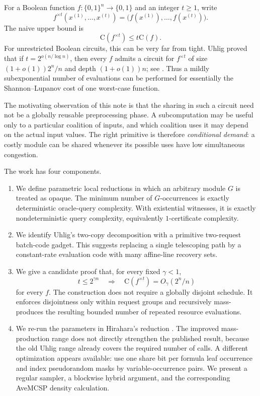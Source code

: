 \documentclass[11pt]{article}
\theoremstyle{definition}
\newcommand{\bits}{\{0,1\}}
\newcommand{\C}{\mathrm{C}}
\begin{document}
For a Boolean function $f:\bits^n\to\bits$ and an integer $t\ge 1$, write
\[
 f^{\times t}(x^{(1)},\ldots,x^{(t)})
   =\bigl(f(x^{(1)}),\ldots,f(x^{(t)})\bigr).
\]
The naive upper bound is
\[
 \C(f^{\times t})\le t\C(f).
\]
For unrestricted Boolean circuits, this can be very far from tight.  Uhlig proved that if
$t=2^{o(n/\log n)}$, then every $f$ admits a circuit for $f^{\times t}$ of size
$(1+o(1))2^n/n$ and depth $(1+o(1))n$; see \cite{Uhlig1974,Uhlig1992,Wegener1987,Kretschmer2023}.  Thus a mildly subexponential number of evaluations can be performed for essentially the Shannon--Lupanov cost of one worst-case function.

The motivating observation of this note is that the sharing in such a circuit need not be a globally reusable preprocessing phase.  A subcomputation may be useful only to a particular coalition of inputs, and which coalition uses it may depend on the actual input values.  The right primitive is therefore \emph{conditional demand}: a costly module can be shared whenever its possible uses have low simultaneous congestion.

The work has four components.

\begin{enumerate}[label=\textbf{\arabic*.}]
\item We define parametric local reductions in which an arbitrary module $G$ is treated as opaque.  The minimum number of $G$-occurrences is exactly deterministic oracle-query complexity.  With existential witnesses, it is exactly nondeterministic query complexity, equivalently $1$-certificate complexity.

\item We identify Uhlig's two-copy decomposition with a primitive two-request batch-code gadget.  This suggests replacing a single telescoping path by a constant-rate evaluation code with many affine-line recovery sets.

\item We give a candidate proof that, for every fixed $\gamma<1$,
\[
   t\le 2^{\gamma n}
   \quad\Longrightarrow\quad
   \C(f^{\times t})=O_\gamma(2^n/n)
\]
for every $f$.  The construction does not require a globally disjoint schedule.  It enforces disjointness only within request groups and recursively mass-produces the resulting bounded number of repeated resource evaluations.

\item We re-run the parameters in Hirahara's reduction \cite{Hirahara2022}.  The improved mass-production range does not directly strengthen the published result, because the old Uhlig range already covers the required number of calls.  A different optimization appears available: use one share bit per formula leaf occurrence and index pseudorandom masks by variable-occurrence pairs.  We present a regular sampler, a blockwise hybrid argument, and the corresponding AveMCSP density calculation.
\end{enumerate}
\end{document}
